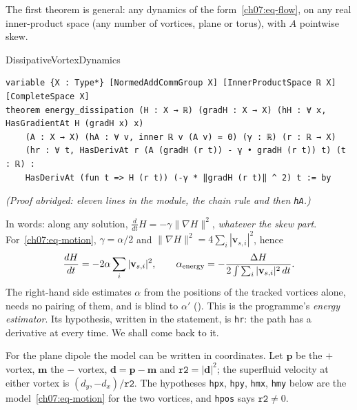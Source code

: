 The first theorem is general: any dynamics of the form~\eqref{ch07:eq-flow}, on any real inner-product space (any number of vortices, plane or torus), with $A$ pointwise skew.

\begin{leanbox}[unbreakable]{DissipativeVortexDynamics}
\begin{lstlisting}[style=lean,basicstyle=\ttfamily\footnotesize]
variable {X : Type*} [NormedAddCommGroup X] [InnerProductSpace ℝ X] [CompleteSpace X]
theorem energy_dissipation (H : X → ℝ) (gradH : X → X) (hH : ∀ x, HasGradientAt H (gradH x) x)
    (A : X → X) (hA : ∀ v, inner ℝ v (A v) = 0) (γ : ℝ) (r : ℝ → X)
    (hr : ∀ t, HasDerivAt r (A (gradH (r t)) - γ • gradH (r t)) t) (t : ℝ) :
    HasDerivAt (fun t => H (r t)) (-γ * ‖gradH (r t)‖ ^ 2) t := by
\end{lstlisting}
\nopagebreak[4]\smallskip\noindent\textit{(Proof abridged: eleven lines in the module, the chain rule and then \texttt{hA}.)}
\end{leanbox}

In words: along any solution, $\frac{d}{dt}H=-\gamma\|\nabla H\|^2$, \emph{whatever the skew part}. For~\eqref{ch07:eq-motion}, $\gamma=\alpha/2$ and $\|\nabla H\|^2=4\sum_i|\mathbf v_{s,i}|^2$, hence
\begin{equation}
  \frac{dH}{dt}=-2\alpha\sum_i|\mathbf v_{s,i}|^2,\qquad
  \alpha_{\rm energy}=-\frac{\Delta H}{2\int\sum_i|\mathbf v_{s,i}|^2\,dt}.
  \label{ch07:eq-energy}
\end{equation}
The right-hand side estimates $\alpha$ from the positions of the tracked vortices alone, needs no pairing of them, and is blind to $\alpha'$ (). This is the programme's
\emph{energy estimator}. Its hypothesis, written in the statement, is \texttt{hr}: the path has a derivative at every time. We shall come back to it.

For the plane dipole the model can be written in coordinates. Let $\mathbf p$ be the $+$ vortex, $\mathbf m$ the $-$ vortex, $\mathbf d=\mathbf p-\mathbf m$ and $\texttt{r2}=|\mathbf d|^2$; the superfluid velocity at either vortex is $(d_y,-d_x)/\texttt{r2}$.
The hypotheses \texttt{hpx}, \texttt{hpy}, \texttt{hmx}, \texttt{hmy} below are the model~\eqref{ch07:eq-motion} for the two vortices, and \texttt{hpos} says $\texttt{r2}\neq0$.

